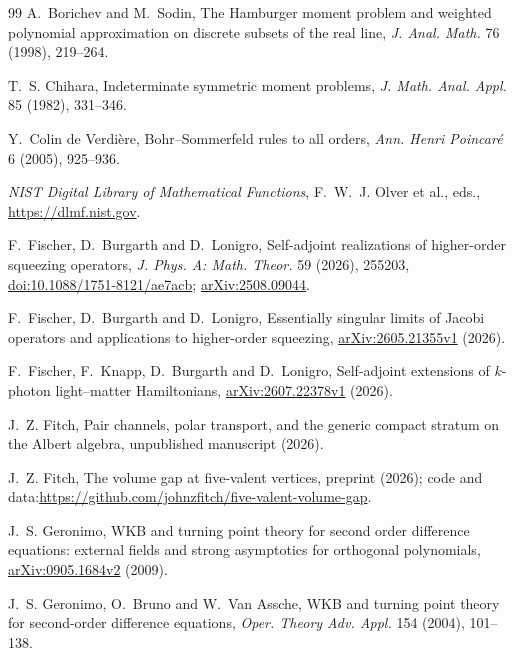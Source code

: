\begin{thebibliography}{99}
A.~Borichev and M.~Sodin, The Hamburger moment problem and weighted polynomial approximation
on discrete subsets of the real line, \emph{J. Anal. Math.} 76 (1998), 219--264.

T.~S. Chihara, Indeterminate symmetric moment problems, \emph{J. Math. Anal. Appl.} 85 (1982),
331--346.

Y.~Colin de Verdi\`ere, Bohr--Sommerfeld rules to all orders, \emph{Ann. Henri Poincar\'e} 6
(2005), 925--936.

\emph{NIST Digital Library of Mathematical Functions}, F.~W.~J. Olver et al., eds.,
\url{https://dlmf.nist.gov}.

F.~Fischer, D.~Burgarth and D.~Lonigro, Self-adjoint realizations of higher-order squeezing
operators, \emph{J. Phys. A: Math. Theor.} 59 (2026), 255203,
\href{https://doi.org/10.1088/1751-8121/ae7acb}{doi:10.1088/1751-8121/ae7acb};
\href{https://arxiv.org/abs/2508.09044}{arXiv:2508.09044}.

F.~Fischer, D.~Burgarth and D.~Lonigro, Essentially singular limits of Jacobi operators and
applications to higher-order squeezing, \href{https://arxiv.org/abs/2605.21355}{arXiv:2605.21355v1} (2026).

F.~Fischer, F.~Knapp, D.~Burgarth and D.~Lonigro, Self-adjoint extensions of $k$-photon
light--matter Hamiltonians, \href{https://arxiv.org/abs/2607.22378}{arXiv:2607.22378v1} (2026).

\enlargethispage{\baselineskip}%
J.~Z. Fitch, Pair channels, polar transport, and the generic compact stratum on the Albert
algebra, unpublished manuscript (2026).

J.~Z. Fitch, The volume gap at five-valent vertices, preprint (2026);
code and data:\newline\url{https://github.com/johnzfitch/five-valent-volume-gap}.

J.~S. Geronimo, WKB and turning point theory for second order difference equations: external
fields and strong asymptotics for orthogonal polynomials,
\href{https://arxiv.org/abs/0905.1684}{arXiv:0905.1684v2} (2009).

J.~S. Geronimo, O.~Bruno and W.~Van Assche, WKB and turning point theory for second-order
difference equations, \emph{Oper. Theory Adv. Appl.} 154 (2004), 101--138.


\end{thebibliography}
